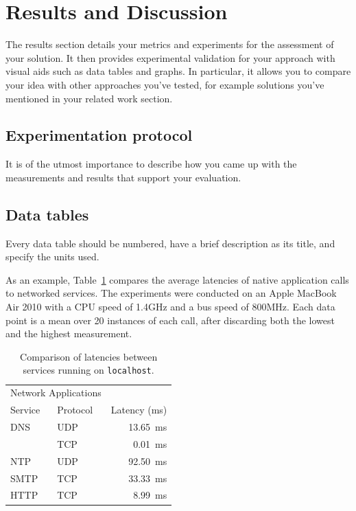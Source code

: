 \documentclass{scrartcl}
\begin{document}
\section{Results and Discussion}

The results section details your metrics and experiments for the assessment of your solution. It then provides experimental validation for your approach with visual aids such as data tables and graphs. In particular, it allows you to compare your idea with other approaches you've tested, for example solutions you've mentioned in your related work section.

\subsection{Experimentation protocol}

It is of the utmost importance to describe how you came up with the measurements and results that support your evaluation.

\subsection{Data tables}

Every data table should be numbered, have a brief description as its title, and specify the units used.

As an example, Table~\ref{tab:my_label} compares the average latencies of native application calls to networked services. The experiments were conducted on an Apple MacBook Air 2010 with a CPU speed of 1.4GHz and a bus speed of 800MHz. Each data point is a mean over 20 instances of each call, after discarding both the lowest and the highest measurement.

\begin{table}[ht]
  \centering
  \begin{tabular}{llr}
    \hline
    \multicolumn{2}{c}{Network Applications} \\
    \cline{1-2}
    Service    & Protocol & Latency (\si{\ms}) \\
    \hline
    DNS         & UDP       & \SI{13.65}{\ms}      \\
               & TCP       & \SI{0.01}{\ms}       \\
    NTP         & UDP       & \SI{92.50}{\ms}      \\
    SMTP        & TCP       & \SI{33.33}{\ms}      \\
    HTTP        & TCP       & \SI{8.99}{\ms}       \\
    \hline
  \end{tabular}
  \caption{Comparison of latencies between services running on \texttt{localhost}.}
  \label{tab:my_label}
\end{table}
\end{document}
